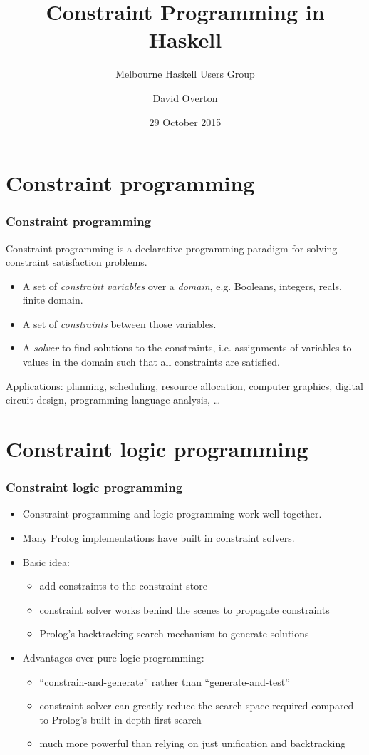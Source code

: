 \documentclass[aspectratio=169,hyphens]{beamer} %
\title{Constraint Programming in Haskell}
\subtitle{Melbourne Haskell Users Group}
\author{David Overton}
\date{29 October 2015}
\begin{document}
\frame{\titlepage}

\section{Constraint programming}

\begin{frame}
    \frametitle{Constraint programming}
    Constraint programming is a declarative programming paradigm for solving constraint satisfaction problems.
    \pause
    \begin{itemize}
        \item A set of \emph{constraint variables} over a \emph{domain}, e.g. Booleans, integers, reals, finite domain.
        \item A set of \emph{constraints} between those variables.
        \item A \emph{solver} to find solutions to the constraints, i.e. assignments of variables to values in the domain such that all constraints are satisfied.
    \end{itemize}
    \pause
    Applications: planning, scheduling, resource allocation, computer graphics, digital circuit design, programming language analysis, \ldots
\end{frame}

\section{Constraint logic programming}

\begin{frame}
    \frametitle{Constraint logic programming}
    \begin{itemize}
        \item Constraint programming and logic programming work well together.
        \item Many Prolog implementations have built in constraint solvers.
        \item Basic idea:
            \begin{itemize}
                \item add constraints to the constraint store
                \item constraint solver works behind the scenes to propagate constraints
                \item Prolog's backtracking search mechanism to generate solutions
            \end{itemize}
        \item Advantages over pure logic programming:
            \begin{itemize}
                \item ``constrain-and-generate'' rather than ``generate-and-test''
                \item constraint solver can greatly reduce the search space required compared to Prolog's built-in depth-first-search
                \item much more powerful than relying on just unification and backtracking
            \end{itemize}
    \end{itemize}
\end{frame}
\end{document}
